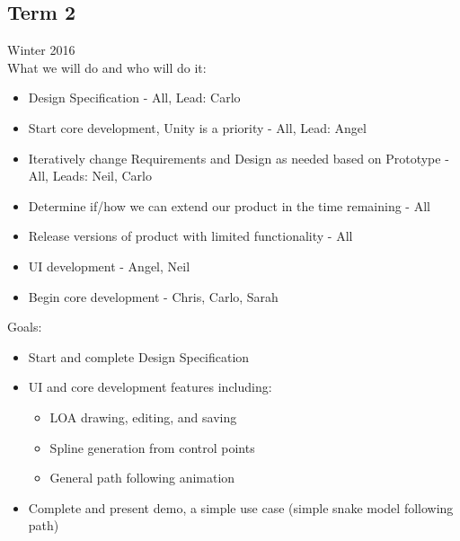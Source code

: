 \subsection{Term 2}
Winter 2016 \\
What we will do and who will do it:
\begin{itemize}
	\item Design Specification - All, Lead: Carlo
	\item Start core development, Unity is a priority - All, Lead: Angel
	\item Iteratively change Requirements and Design as needed based on Prototype - All, Leads: Neil, Carlo
	\item Determine if/how we can extend our product in the time remaining - All
	\item Release versions of product with limited functionality - All
	\item UI development - Angel, Neil
	\item Begin core development - Chris, Carlo, Sarah
\end{itemize}

Goals:\\
\begin{itemize}
	\item Start and complete Design Specification
	\item UI and core development features including: 
	\begin{itemize}
		\item LOA drawing, editing, and saving
		\item Spline generation from control points
		\item General path following animation
	\end{itemize}
	\item Complete and present demo, a simple use case (simple snake model following path)
\end{itemize}

